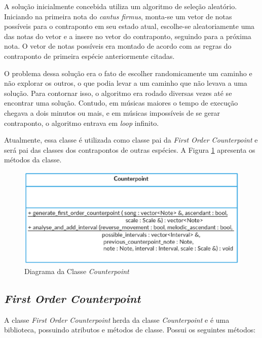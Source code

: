     A solução inicialmente concebida utiliza um algoritmo de seleção aleatório. Iniciando na primeira nota do \textit{cantus firmus}, monta-se um vetor de notas possíveis para o contraponto em seu estado atual, escolhe-se aleatoriamente uma das notas do vetor e a insere no vetor do contraponto, seguindo para a próxima nota. O vetor de notas possíveis era montado de acordo com as regras do contraponto de primeira espécie anteriormente citadas.

    O problema dessa solução era o fato de escolher randomicamente um caminho e não explorar os outros, o que podia levar a um caminho que não levava a uma solução. Para contornar isso, o algoritmo era rodado diversas vezes até se encontrar uma solução. Contudo, em músicas maiores o tempo de execução chegava a dois minutos ou mais, e em músicas impossíveis de se gerar contraponto, o algoritmo entrava em \textit{loop} infinito.

    Atualmente, essa classe é utilizada como classe pai da \textit{First Order Counterpoint} e será pai das classes dos contrapontos de outras espécies. A Figura \ref{counterpointclass} apresenta os métodos da classe.

    \begin{figure}[htb]
      \centering
      \includegraphics[scale=0.7]{figuras/counterpointclass.eps}
      \caption{Diagrama da Classe \textit{Counterpoint}}
      \label{counterpointclass}
    \end{figure}

    \subsection[\textit{First Order Counterpoint}]{\textit{First Order Counterpoint}}

      A classe \textit{First Order Counterpoint} herda da classe \textit{Counterpoint} e é uma biblioteca, possuindo atributos e métodos de classe. Possui os seguintes métodos:

